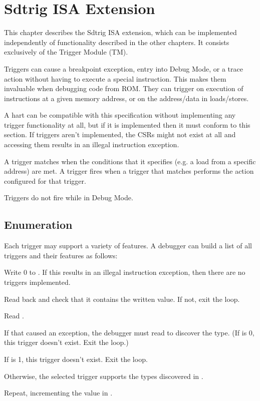 \chapter{Sdtrig ISA Extension}
\label{sec:trigger}

This chapter describes the Sdtrig ISA extension, which can be implemented
independently of functionality described in the other chapters. It consists
exclusively of the Trigger Module (TM).

Triggers can cause a breakpoint exception, entry into Debug Mode, or a trace action
without having to execute a special instruction. This makes them invaluable
when debugging code from ROM. They can trigger on execution of instructions at
a given memory address, or on the address/data in loads/stores.

A hart can be compatible with this specification without implementing any
trigger functionality at all, but if it is implemented then it must conform to
this section. If triggers aren't implemented, the CSRs might not exist at all and
accessing them results in an illegal instruction exception.

A trigger matches when the conditions that it specifies (e.g. a load from a
specific address) are met. A trigger fires when a trigger that matches performs
the action configured for that trigger.

Triggers do not fire while in Debug Mode.

\section{Enumeration}

\begin{steps}{Each trigger may support a variety of features. A debugger can
    build a list of all triggers and their features as follows:}
\item Write 0 to \RcsrTselect. If this results in an illegal instruction
    exception, then there are no triggers implemented.
\item Read back \RcsrTselect and check that it contains the written value. If not,
    exit the loop.
\item Read \RcsrTinfo.
\item If that caused an exception, the debugger must read \RcsrTdataOne to
    discover the type. (If \FcsrTdataOneType is 0, this trigger doesn't exist. Exit the
    loop.)
\item If \FcsrTinfoInfo is 1, this trigger doesn't exist. Exit the loop.
\item Otherwise, the selected trigger supports the types discovered in \FcsrTinfoInfo.
\item Repeat, incrementing the value in \RcsrTselect.
\end{steps}

